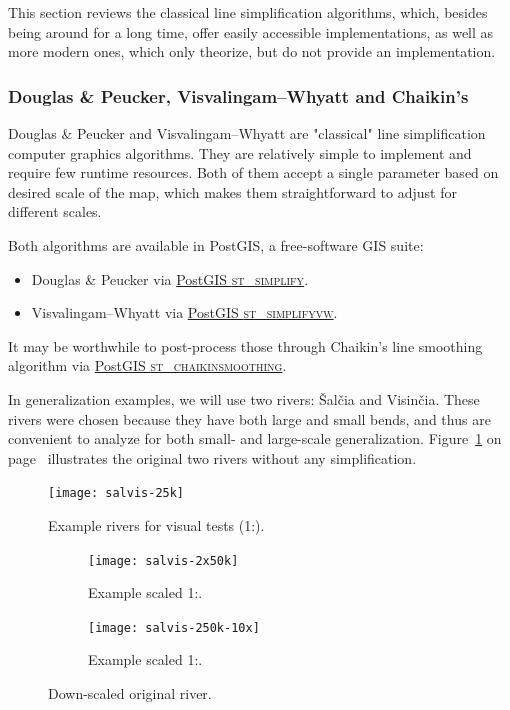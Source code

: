 \documentclass[a4paper]{article}
\newcommand{\onpage}[1]{\ref{#1} on page~\pageref{#1}}
\newcommand{\DP}{Douglas \& Peucker}
\newcommand{\VW}{Visvalingam--Whyatt}
\begin{document}
This section reviews the classical line simplification algorithms, which,
besides being around for a long time, offer easily accessible implementations,
as well as more modern ones, which only theorize, but do not provide an
implementation.

\subsubsection{{\DP}, {\VW} and Chaikin's}
\label{sec:dp-vwchaikin}

{\DP}\cite{douglas1973algorithms} and {\VW}\cite{visvalingam1993line} are
"classical" line simplification computer graphics algorithms. They are
relatively simple to implement and require few runtime resources. Both of them
accept a single parameter based on desired scale of the map, which makes them
straightforward to adjust for different scales.

Both algorithms are available in PostGIS, a free-software GIS suite:
\begin{itemize}
    \item {\DP} via
        \href{https://postgis.net/docs/ST_Simplify.html}{PostGIS \textsc{st\_simplify}}.

    \item {\VW} via
        \href{https://postgis.net/docs/ST_SimplifyVW.html}{PostGIS
        \textsc{st\_simplifyvw}}.
\end{itemize}

It may be worthwhile to post-process those through Chaikin's line smoothing
algorithm\cite{chaikin1974algorithm} via
\href{https://postgis.net/docs/ST_ChaikinSmoothing.html}{PostGIS
\textsc{st\_chaikinsmoothing}}.

In generalization examples, we will use two rivers: Šalčia and Visinčia.
These rivers were chosen because they have both large and small bends, and
thus are convenient to analyze for both small- and large-scale generalization.
Figure~\onpage{fig:salvis-25} illustrates the original two rivers without any
simplification.

\begin{figure}[ht]
    \centering
    \texttt{[image: salvis-25k]}
    \caption{Example rivers for visual tests (1:{}).}
    \label{fig:salvis-25}
\end{figure}

\begin{figure}[ht]
    \centering
    \begin{subfigure}[b]{.49\textwidth}
        \texttt{[image: salvis-2x50k]}
        \caption{Example scaled 1:.}
        \label{fig:salvis-2x50k}
    \end{subfigure}
    \hfill
    \begin{subfigure}[b]{.49\textwidth}
        \centering
        \texttt{[image: salvis-250k-10x]}
        \caption{Example scaled 1:.}
    \end{subfigure}
    \caption{Down-scaled original river.}
    \label{fig:salvis-50-250}
\end{figure}
\end{document}
